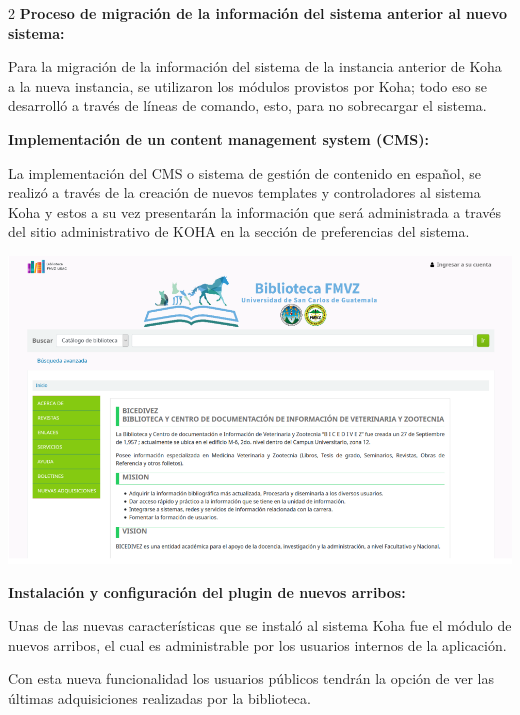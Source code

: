 \documentclass[12pt,spanish,Letterpaper,openany]{book}
\begin{document}
\begin {multicols}{2}
\textbf{Proceso de migración de la información del sistema anterior al nuevo sistema:}

Para la migración de la información del sistema de la instancia anterior de Koha a la nueva instancia, se utilizaron los módulos provistos por Koha; todo eso se desarrolló a través de líneas de comando, esto, para no sobrecargar el sistema.

\textbf{Implementación de un content management system (CMS):}

La implementación del CMS o sistema de gestión de contenido en español, se realizó a través de la creación de nuevos templates y controladores al sistema Koha y estos a su vez presentarán la información que será administrada a través del sitio administrativo de KOHA en la sección de preferencias del sistema.

\begin {flushleft}
\noindent\begin{minipage}[c]{\columnwidth}

\includegraphics[width=1\linewidth]{images/05_02}

\end{minipage}

\end {flushleft}

\textbf{Instalación y configuración del plugin de nuevos arribos:}

Unas de las nuevas características que se instaló al sistema Koha fue el módulo de nuevos arribos, el cual es administrable por los usuarios internos de la aplicación.

Con esta nueva funcionalidad los usuarios públicos tendrán la opción de ver las últimas adquisiciones realizadas por la biblioteca.


\end{multicols}
\end{document}
